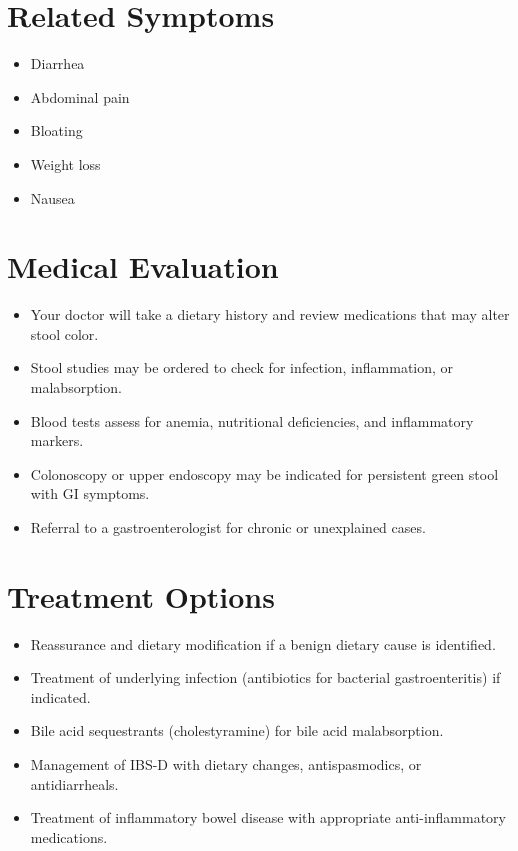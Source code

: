 \section*{Related Symptoms}
\begin{itemize}
  \item Diarrhea
  \item Abdominal pain
  \item Bloating
  \item Weight loss
  \item Nausea
\end{itemize}


\section*{Medical Evaluation}
\begin{itemize}
  \item Your doctor will take a dietary history and review medications that may alter stool color.
  \item Stool studies may be ordered to check for infection, inflammation, or malabsorption.
  \item Blood tests assess for anemia, nutritional deficiencies, and inflammatory markers.
  \item Colonoscopy or upper endoscopy may be indicated for persistent green stool with GI symptoms.
  \item Referral to a gastroenterologist for chronic or unexplained cases.
\end{itemize}

\section*{Treatment Options}
\begin{itemize}
  \item Reassurance and dietary modification if a benign dietary cause is identified.
  \item Treatment of underlying infection (antibiotics for bacterial gastroenteritis) if indicated.
  \item Bile acid sequestrants (cholestyramine) for bile acid malabsorption.
  \item Management of IBS-D with dietary changes, antispasmodics, or antidiarrheals.
  \item Treatment of inflammatory bowel disease with appropriate anti-inflammatory medications.
\end{itemize}

